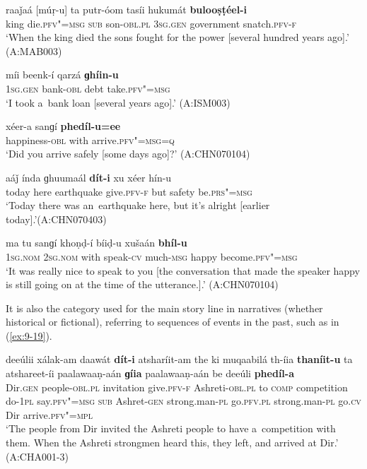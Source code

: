 \begin{exe}
\ex
\label{ex:9-14}
\gll raaǰaá [múṛ-u] ta putr-óom tasíi hukumát \textbf{bulooṣṭéel-i} \\
king die.\textsc{pfv"=msg} \textsc{sub} son-\textsc{obl.pl} \textsc{3sg.gen} government snatch.\textsc{pfv-f} \\
\glt `When the king died the sons fought for the power [several hundred years ago].' (A:MAB003)

\ex
\label{ex:9-15}
\gll míi beenk-í qarzá \textbf{ɡhíin-u}  \\
\textsc{1sg.gen} bank-\textsc{obl} debt take.\textsc{pfv"=msg} \\
\glt `I took a~bank loan [several years ago].' (A:ISM003) 

\ex
\label{ex:9-16}
\gll xéer-a sanɡí \textbf{phedíl-u=ee} \\
happiness-\textsc{obl} with arrive.\textsc{pfv"=msg=q} \\
\glt `Did you arrive safely [some days ago]?' (A:CHN070104)

\ex
\label{ex:9-17}
\gll aáǰ índa ɡhuumaál \textbf{dít-i} xu xéer hín-u\\
today here earthquake give.\textsc{pfv-f} but safety be.\textsc{prs"=msg}  \\
\glt `Today there was an~earthquake here, but it's alright [earlier today].'\newline (A:CHN070403)

\ex
\label{ex:9-18}
\gll ma tu sanɡí khoṇḍ-í bíiḍ-u xušaán \textbf{bhíl-u} \\
\textsc{1sg.nom} \textsc{2}\textsc{sg.nom} with speak-\textsc{cv} much-\textsc{msg} happy become.\textsc{pfv"=msg} \\
\glt `It was really nice to speak to you [the conversation that made the speaker happy is still going on at the time of the utterance.].' (A:CHN070104)
\end{exe}

It is also the category used for the main story line in narratives (whether historical or fictional), referring to sequences of events in the past, such as in (\ref{ex:9-19}).

\ea
\label{ex:9-19}
\gll deeúlii xálak-am daawát \textbf{dít-i} atsharíit-am the ki muqaabilá th-íia \textbf{thaníit-u} ta atshareet-íi paalawaaṇ-aán \textbf{ɡíia} paalawaaṇ-aán be deeúli \textbf{phedíl-a}\\
Dir.\textsc{gen} people-\textsc{obl.pl} invitation give.\textsc{pfv-f}  Ashreti-\textsc{obl.pl} to \textsc{comp} competition do-\textsc{1pl}  say.\textsc{pfv"=msg} \textsc{sub} Ashret-\textsc{gen} strong.man-\textsc{pl} go.\textsc{pfv.pl}  strong.man-\textsc{pl} go.\textsc{cv} Dir arrive.\textsc{pfv"=mpl} \\
\glt `The people from Dir invited the Ashreti people to have a~competition with them. When the Ashreti strongmen heard this, they left, and arrived at Dir.' (A:CHA001-3)
\z

